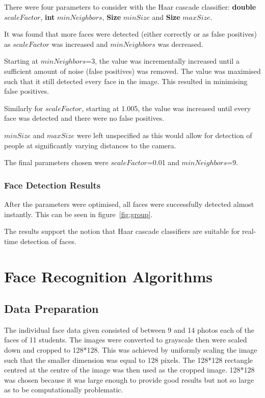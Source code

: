 \documentclass{article}
\begin{document}
There were four parameters to consider with the Haar cascade classifier: \textbf{double} $scaleFactor$, \textbf{int} $minNeighbors$, \textbf{Size} $minSize$ and \textbf{Size} $maxSize$.

It was found that more faces were detected (either correctly or as false positives) as $scaleFactor$ was increased and $minNeighbors$ was decreased.

Starting at $minNeighbors$=3, the value was incrementally increased until a sufficient amount of noise (false positives) was removed. The value was maximised such that it still detected every face in the image. This resulted in minimising false positives.

Similarly for $scaleFactor$, starting at 1.005, the value was increased until every face was detected and there were no false positives.

$minSize$ and $maxSize$ were left unspecified as this would allow for detection of people at significantly varying distances to the camera.

The final parameters chosen were $scaleFactor$=0.01 and $minNeighbors$=9.

\subsubsection{Face Detection Results}
After the parameters were optimised, all faces were successfully detected almost instantly. This can be seen in figure~\ref{fig:group}.

The results support the notion that Haar cascade classifiers are suitable for real-time detection of faces.

\section{Face Recognition Algorithms}
\subsection{Data Preparation}
The individual face data given consisted of between 9 and 14 photos each of the faces of 11 students. The images were converted to grayscale then were scaled down and cropped to 128*128. This was achieved by uniformly scaling the image such that the smaller dimension was equal to 128 pixels. The 128*128 rectangle centred at the centre of the image was then used as the cropped image. 128*128 was chosen because it was large enough to provide good results but not so large as to be computationally problematic.
\end{document}
